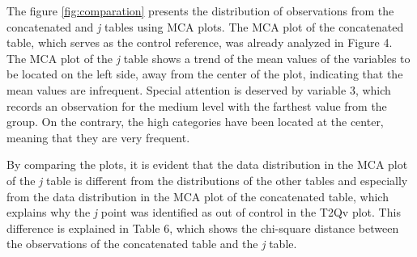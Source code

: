 \documentclass[mathematics,article,submit,moreauthors,pdftex]{mdpi}
\begin{document}
The figure \ref{fig:comparation} presents the distribution of
observations from the concatenated and \emph{j} tables using MCA plots.
The MCA plot of the concatenated table, which serves as the control
reference, was already analyzed in Figure 4. The MCA plot of the
\emph{j} table shows a trend of the mean values of the variables to be
located on the left side, away from the center of the plot, indicating
that the mean values are infrequent. Special attention is deserved by
variable 3, which records an observation for the medium level with the
farthest value from the group. On the contrary, the high categories have
been located at the center, meaning that they are very frequent.

By comparing the plots, it is evident that the data distribution in the
MCA plot of the \emph{j} table is different from the distributions of
the other tables and especially from the data distribution in the MCA
plot of the concatenated table, which explains why the \emph{j} point
was identified as out of control in the T2Qv plot. This difference is
explained in Table 6, which shows the chi-square distance between the
observations of the concatenated table and the \emph{j} table.
\end{document}
